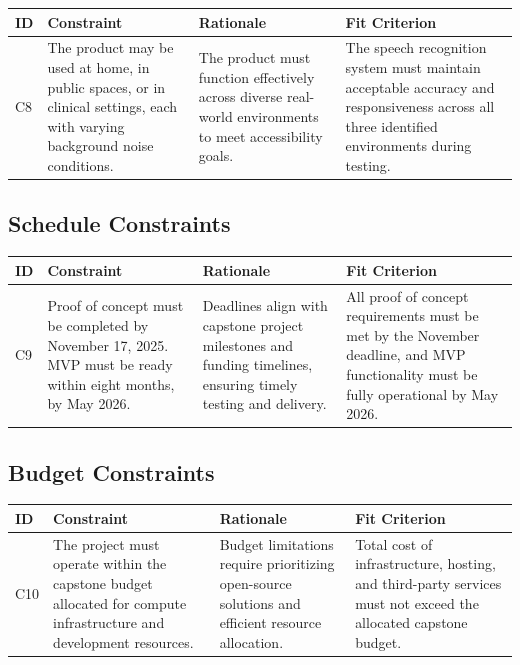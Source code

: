 \documentclass[11pt]{article}
\begin{document}
\begin{tabularx}{\textwidth}{p{1cm}X X X}
\toprule
\textbf{ID} & \textbf{Constraint} & \textbf{Rationale} & \textbf{Fit Criterion} \\
\midrule
C8 & The product may be used at home, in public spaces, or in clinical settings, each with varying background noise conditions. & The product must function effectively across diverse real-world environments to meet accessibility goals. & The speech recognition system must maintain acceptable accuracy and responsiveness across all three identified environments during testing. \\
\bottomrule
\end{tabularx}


\subsection{Schedule Constraints}


\begin{tabularx}{\textwidth}{p{1cm}X X X}

\toprule
\textbf{ID} & \textbf{Constraint} & \textbf{Rationale} & \textbf{Fit Criterion} \\
\midrule
C9 & Proof of concept must be completed by November 17, 2025. MVP must be ready within eight months, by May 2026. & Deadlines align with capstone project milestones and funding timelines, ensuring timely testing and delivery. & All proof of concept requirements must be met by the November deadline, and MVP functionality must be fully operational by May 2026. \\
\bottomrule
\end{tabularx}

\subsection{Budget Constraints}

\begin{tabularx}{\textwidth}{p{1cm}X X X}
\toprule
\textbf{ID} & \textbf{Constraint} & \textbf{Rationale} & \textbf{Fit Criterion} \\
\midrule
C10 & The project must operate within the capstone budget allocated for compute infrastructure and development resources. & Budget limitations require prioritizing open-source solutions and efficient resource allocation. & Total cost of infrastructure, hosting, and third-party services must not exceed the allocated capstone budget. \\
\bottomrule
\end{tabularx}
\end{document}
